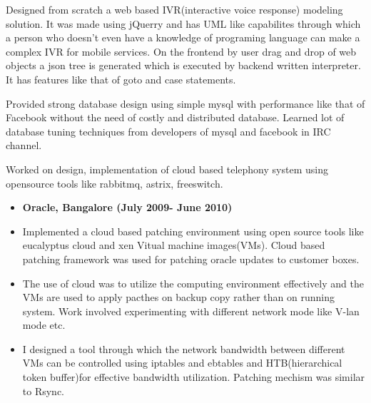 \documentclass[]{res}
\begin{document}
\begin{description}
\begin{itemize}
{\item Designed from scratch a web based IVR(interactive voice response) modeling solution. It was made using jQuerry and has UML like capabilites through which a person who doesn't even  have a knowledge of programing language can make a complex IVR for mobile services. On the frontend by user drag and drop of web objects a json tree is generated which is executed by backend written interpreter. It has features like that of goto and case statements.

\item  Provided strong database design using simple mysql with performance like that of Facebook without the need of costly and distributed database. Learned lot of
database tuning techniques from developers of mysql and facebook in IRC channel.

\item Worked on design, implementation of cloud based telephony system using opensource tools like rabbitmq, astrix, freeswitch.

}
\end {itemize}


\item[]
\begin{itemize}
\item \textbf{ Oracle, Bangalore    (July 2009- June 2010)}\\

\item Implemented a cloud based patching environment using open source tools like eucalyptus cloud and xen Vitual machine images(VMs). Cloud based patching framework was used for patching oracle updates to customer boxes.


\item The use of cloud was to utilize the computing environment effectively and the VMs are used to apply pacthes on backup copy rather than on running system. Work involved experimenting with different network mode like V-lan mode etc. 



\item  I designed a tool through which the network bandwidth between different VMs can be controlled using iptables and ebtables and HTB(hierarchical token buffer)for effective bandwidth utilization. Patching mechism was similar to Rsync.  


\end{itemize}
\end{description}
\end{document}
